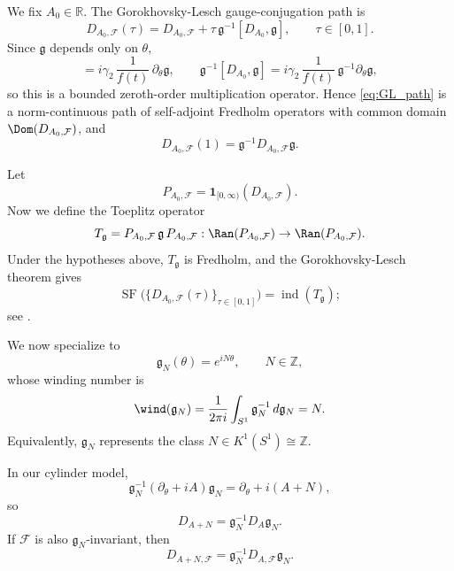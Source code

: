 \documentclass[11pt]{article}
\theoremstyle{definition}
\DeclareMathOperator{\ind}{ind}
\numberwithin{equation}{section}
\begin{document}
We fix \(A_0\in\mathbb R\). The Gorokhovsky-Lesch gauge-conjugation path is
\begin{equation}\label{eq:GL_path}
D_{A_0,\mathcal F}(\tau)
=
D_{A_0,\mathcal F}
+
\tau\,\mathfrak g^{-1}[D_{A_0},\mathfrak g],
\qquad \tau\in[0,1].
\end{equation}
Since \(\mathfrak g\) depends only on \(\theta\),
\begin{equation}
[D_{A_0},\mathfrak g]
=
i\gamma_2\,\frac1{f(t)}\,\partial_\theta\mathfrak g,
\qquad
\mathfrak g^{-1}[D_{A_0},\mathfrak g]
=
i\gamma_2\,\frac1{f(t)}\,\mathfrak g^{-1}\partial_\theta\mathfrak g,
\end{equation}
so this is a bounded zeroth-order multiplication operator. Hence \eqref{eq:GL_path} is a norm-continuous path of self-adjoint Fredholm operators with common domain \(\Dom(D_{A_0,\mathcal F})\), and
\begin{equation}
D_{A_0,\mathcal F}(1)=\mathfrak g^{-1}D_{A_0,\mathcal F}\mathfrak g.
\end{equation}

Let
\begin{equation}
P_{A_0,\mathcal F}=\mathbf 1_{[0,\infty)}(D_{A_0,\mathcal F}).
\end{equation}
Now we define the Toeplitz operator
\begin{equation}
T_{\mathfrak g}
=
P_{A_0,\mathcal F}\,\mathfrak g\,P_{A_0,\mathcal F}
:
\Ran(P_{A_0,\mathcal F})\to \Ran(P_{A_0,\mathcal F}).
\end{equation}
Under the hypotheses above, \(T_{\mathfrak g}\) is Fredholm, and the Gorokhovsky-Lesch theorem gives
\begin{equation}\label{eq:GL_SF_Toeplitz}
\operatorname{SF}\bigl(\{D_{A_0,\mathcal F}(\tau)\}_{\tau\in[0,1]}\bigr)
=
\ind(T_{\mathfrak g});
\end{equation}
see \cite{GorokhovskyLesch2013}.

We now specialize to
\begin{equation}
\mathfrak g_N(\theta)=e^{iN\theta},
\qquad N\in\mathbb Z,
\end{equation}
whose winding number is
\begin{equation}\label{eq:winding_def}
\wind(\mathfrak g_N)
=
\frac{1}{2\pi i}\int_{S^1}\mathfrak g_N^{-1}\,d\mathfrak g_N
=
N.
\end{equation}
Equivalently, \(\mathfrak g_N\) represents the class \(N\in K^1(S^1)\cong\mathbb Z\).

In our cylinder model,
\begin{equation}
\mathfrak g_N^{-1}(\partial_\theta+iA)\mathfrak g_N
=
\partial_\theta+i(A+N),
\end{equation}
so
\begin{equation}\label{eq:gauge_shift_bulk}
D_{A+N}=\mathfrak g_N^{-1}D_A\mathfrak g_N.
\end{equation}
If \(\mathcal F\) is also \(\mathfrak g_N\)-invariant, then
\begin{equation}\label{eq:gauge_shift_realization}
D_{A+N,\mathcal F}
=
\mathfrak g_N^{-1}D_{A,\mathcal F}\mathfrak g_N.
\end{equation}
\end{document}
